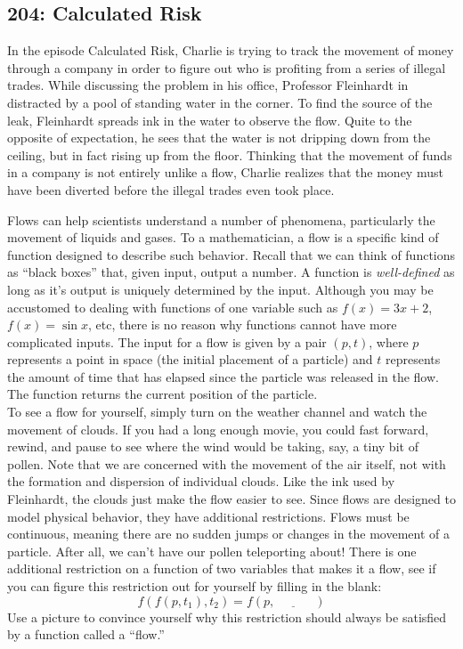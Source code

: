 \newpage
\subsection{204: Calculated Risk\label{204}}

In the episode Calculated Risk, Charlie is trying to track the movement of money through a company in order to figure out who is profiting from a series of illegal trades. While discussing the problem in his office, Professor Fleinhardt in distracted by a pool of standing water in the corner. To find the source of the leak, Fleinhardt spreads ink in the water to observe the flow. Quite to the opposite of expectation, he sees that the water is not dripping down from the ceiling, but in fact rising up from the floor. Thinking that the movement of funds in a company is not entirely unlike a flow, Charlie realizes that the money must have been diverted before the illegal trades even took place. \\


Flows can help scientists understand a number of phenomena, particularly the movement of liquids and gases. To a mathematician, a flow is a specific kind of function designed to describe such behavior. Recall that we can think of functions as ``black boxes'' that, given input, output a number. A function is \emph{well-defined} as long as it's output is uniquely determined by the input. Although you may be accustomed to dealing with functions of one variable such as $f(x) = 3x + 2$, $f(x)= \sin x$, etc, there is no reason why functions cannot have more complicated inputs. The input for a flow is given by a pair $(p,t)$, where $p$ represents a point in space (the initial placement of a particle) and $t$ represents the amount of time that has elapsed since the particle was released in the flow. The function returns the current position of the particle. \\

To see a flow for yourself, simply turn on the weather channel and watch the movement of clouds. If you had a long enough movie, you could fast forward, rewind, and pause to see where the wind would be taking, say, a tiny bit of pollen. Note that we are concerned with the movement of the air itself, not with the formation and dispersion of individual clouds. Like the ink used by Fleinhardt, the clouds just make the flow easier to see. Since flows are designed to model physical behavior, they have additional restrictions. Flows must be continuous, meaning there are no sudden jumps or changes in the movement of a particle. After all, we can't have our pollen teleporting about! There is one additional restriction on a function of two variables that makes it a flow, see if you can figure this restriction out for yourself by filling in the blank:
	\[
	f(f(p,t_1),t_2)=f(p,\underline{\phantom{xxxxx}}\;)
	\]
Use a picture to convince yourself why this restriction should always be satisfied by a function called a ``flow.'' \\


